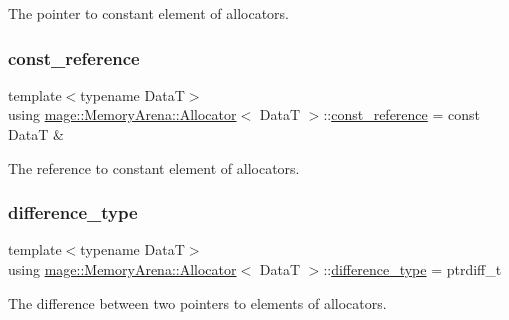 The pointer to constant element of allocators. \hypertarget{structmage_1_1_memory_arena_1_1_allocator_a22e7c887e2578fb0cd253a6d7404ac1b}{}\label{structmage_1_1_memory_arena_1_1_allocator_a22e7c887e2578fb0cd253a6d7404ac1b} 
\subsubsection{\texorpdfstring{const\+\_\+reference}{const\_reference}}
{\footnotesize\ttfamily template$<$typename DataT$>$ \\
using \hyperlink{structmage_1_1_memory_arena_1_1_allocator}{mage\+::\+Memory\+Arena\+::\+Allocator}$<$ DataT $>$\+::\hyperlink{structmage_1_1_memory_arena_1_1_allocator_a22e7c887e2578fb0cd253a6d7404ac1b}{const\+\_\+reference} =  const DataT \&}

The reference to constant element of allocators. \hypertarget{structmage_1_1_memory_arena_1_1_allocator_ab9c65276a085579673b0e77efe64fdee}{}\label{structmage_1_1_memory_arena_1_1_allocator_ab9c65276a085579673b0e77efe64fdee} 
\subsubsection{\texorpdfstring{difference\+\_\+type}{difference\_type}}
{\footnotesize\ttfamily template$<$typename DataT$>$ \\
using \hyperlink{structmage_1_1_memory_arena_1_1_allocator}{mage\+::\+Memory\+Arena\+::\+Allocator}$<$ DataT $>$\+::\hyperlink{structmage_1_1_memory_arena_1_1_allocator_ab9c65276a085579673b0e77efe64fdee}{difference\+\_\+type} =  ptrdiff\+\_\+t}

The difference between two pointers to elements of allocators. \hypertarget{structmage_1_1_memory_arena_1_1_allocator_a06c19054bb02d7e7c982434c47f19adf}{}\label{structmage_1_1_memory_arena_1_1_allocator_a06c19054bb02d7e7c982434c47f19adf} 
